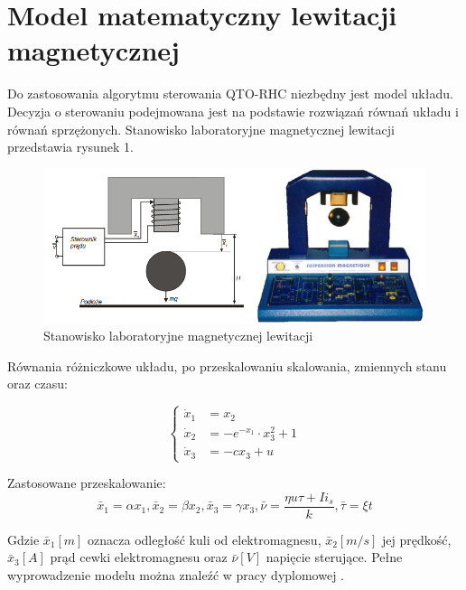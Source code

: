 \section{Model matematyczny lewitacji magnetycznej}

Do zastosowania algorytmu sterowania QTO-RHC niezbędny jest model układu. Decyzja o sterowaniu podejmowana jest na podstawie rozwiązań równań układu i równań sprzężonych. Stanowisko laboratoryjne magnetycznej lewitacji przedstawia rysunek 1.

\begin{figure}[!htb]
  \begin{center}
    \includegraphics[scale=0.85]{img/maglev.PNG}
    \caption{Stanowisko laboratoryjne magnetycznej lewitacji}
  \end{center}
  
  \label{rys:maglev}
\end{figure}

Równania różniczkowe układu, po przeskalowaniu skalowania, zmiennych stanu oraz czasu:

\begin{equation} \label{maglev_rown}
  \begin{cases}
    \dot{x}_1 & = x_2 \\
    \dot{x}_2 & = -e^{-x_1} \cdot x_3^2 + 1 \\
    \dot{x}_3 & = -cx_3 + u
    \end{cases}
\end{equation}

Zastosowane przeskalowanie:
\begin{equation}
\bar{x}_1 = \alpha x_1,
\bar{x}_2 = \beta x_2,
\bar{x}_3 = \gamma x_3,
\bar{\nu} = \frac{\eta u \tau + I i_s}{k},
\bar{\tau} = \xi t
\end{equation}

Gdzie $\bar{x}_1 [m]$ oznacza odległość kuli od elektromagnesu, $\bar{x}_2 [m/s]$ jej prędkość,  $\bar{x}_3 [A]$ prąd cewki elektromagnesu oraz $\bar{\nu} [V]$ napięcie sterujące. Pełne wyprowadzenie modelu można znaleźć w pracy dyplomowej \cite{Bania1999}.
 
